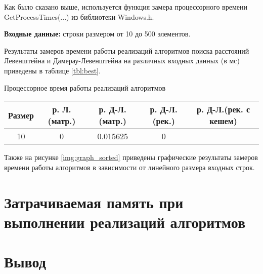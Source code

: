 Как было сказано выше, используется функция замера процессорного времени GetProcessTimes(...) из библиотеки Windows.h. 

\textbf{Входные данные:} строки размером от 10 до 500 элементов.

Результаты замеров времени работы реализаций алгоритмов поиска расстояний Левенштейна и Дамерау-Левенштейна на различных входных данных (в мс) приведены в таблице \ref{tbl:best}.


\begin{center}
	\begin{threeparttable}
		\caption{Процессорное время работы реализаций алгоритмов}
		\label{tbl:best}
		\begin{tabular}{|c|c|c|c|c|}
			\hline
			Размер &р. Л.(матр.) &р. Д-Л.(матр.)  &р. Д-Л.(рек.)&р. Д-Л.(рек. с кешем)\\
			\hline
			10 & 0  &  0.015625 &0 & \\ 
			\hline
		
		\end{tabular}
		
	\end{threeparttable}
\end{center}
Также на рисунке \ref{img:graph_sorted} приведены графические результаты замеров времени работы алгоритмов в зависимости от линейного размера входных строк.

\begin{center}
	\label{img:graph_sorted}
\end{center}
\newpage

\section{Затрачиваемая память при выполнении реализаций алгоритмов}

\section{Вывод}
